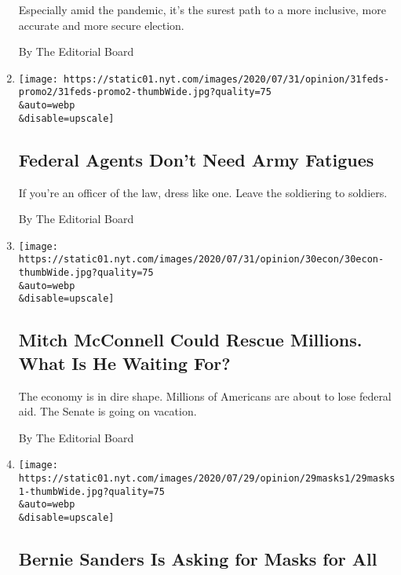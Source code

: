 \begin{enumerate}
  Especially amid the pandemic, it's the surest path to a more
  inclusive, more accurate and more secure election.

  By The Editorial Board
\item
  \href{/2020/07/31/opinion/federal-agents-trump-uniforms.html}{}

  \texttt{[image: https://static01.nyt.com/images/2020/07/31/opinion/31feds-promo2/31feds-promo2-thumbWide.jpg?quality=75\\\&auto=webp\\\&disable=upscale]}

  \hypertarget{federal-agents-dont-need-army-fatigues}{%
  \subsection{Federal Agents Don't Need Army
  Fatigues}\label{federal-agents-dont-need-army-fatigues}}

  If you're an officer of the law, dress like one. Leave the soldiering
  to soldiers.

  By The Editorial Board
\item
  \href{/2020/07/30/opinion/mitch-mcconnell-coronavirus-economy.html}{}

  \texttt{[image: https://static01.nyt.com/images/2020/07/31/opinion/30econ/30econ-thumbWide.jpg?quality=75\\\&auto=webp\\\&disable=upscale]}

  \hypertarget{mitch-mcconnell-could-rescue-millions-what-is-he-waiting-for}{%
  \subsection{Mitch McConnell Could Rescue Millions. What Is He Waiting
  For?}\label{mitch-mcconnell-could-rescue-millions-what-is-he-waiting-for}}

  The economy is in dire shape. Millions of Americans are about to lose
  federal aid. The Senate is going on vacation.

  By The Editorial Board
\item
  \href{/2020/07/29/opinion/us-coronavirus-masks.html}{}

  \texttt{[image: https://static01.nyt.com/images/2020/07/29/opinion/29masks1/29masks1-thumbWide.jpg?quality=75\\\&auto=webp\\\&disable=upscale]}

  \hypertarget{bernie-sanders-is-asking-for-masks-for-all}{%
  \subsection{Bernie Sanders Is Asking for Masks for
  All}\label{bernie-sanders-is-asking-for-masks-for-all}}


\end{enumerate}

